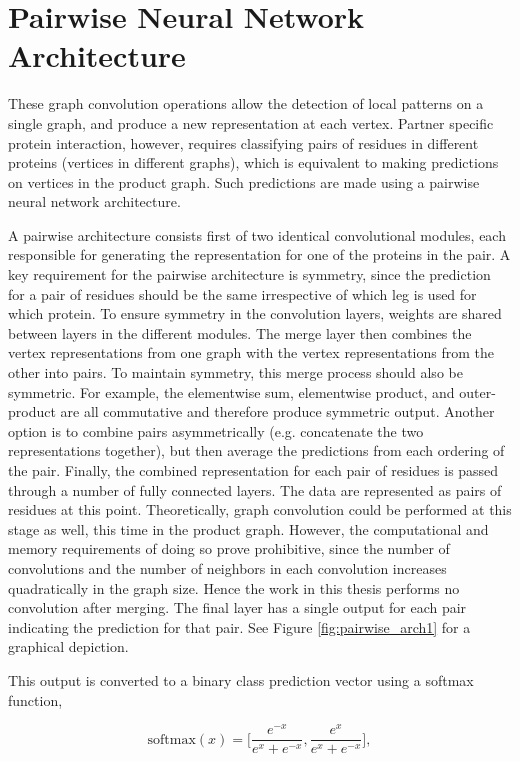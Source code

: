 \section{Pairwise Neural Network Architecture}
These graph convolution operations allow the detection of local patterns on a single graph, and produce a new representation at each vertex.
Partner specific protein interaction, however, requires classifying pairs of residues in different proteins (vertices in different graphs), which is equivalent to making predictions on vertices in the product graph. 
Such predictions are made using a pairwise neural network architecture.

A pairwise architecture consists first of two identical convolutional modules, each responsible for generating the representation for one of the proteins in the pair.
A key requirement for the pairwise architecture is symmetry, since the prediction for a pair of residues should be the same irrespective of which leg is used for which protein.
To ensure symmetry in the convolution layers, weights are shared between layers in the different modules.
The merge layer then combines the vertex representations from one graph with the vertex representations from the other into pairs.
To maintain symmetry, this merge process should also be symmetric.
For example, the elementwise sum, elementwise product, and outer-product are all commutative and therefore produce symmetric output.
Another option is to combine pairs asymmetrically (e.g. concatenate the two representations together), but then average the predictions from each ordering of the pair.
Finally, the combined representation for each pair of residues is passed through a number of fully connected layers.
The data are represented as pairs of residues at this point. 
Theoretically, graph convolution could be performed at this stage as well, this time in the product graph.
However, the computational and memory requirements of doing so prove prohibitive, since the number of convolutions and the number of neighbors in each convolution increases quadratically in the graph size.
Hence the work in this thesis performs no convolution after merging.
The final layer has a single output for each pair indicating the prediction for that pair.
See Figure \ref{fig:pairwise_arch1} for a graphical depiction.

This output is converted to a binary class prediction vector using a softmax function, 

\begin{equation}
\text{softmax}(x) = \bigg[ \frac{e^{-x}}{e^{x} + e^{-x}} , \frac{e^{x}}{e^{x} + e^{-x}} \bigg],
\label{eq:softmax}
\end{equation}

